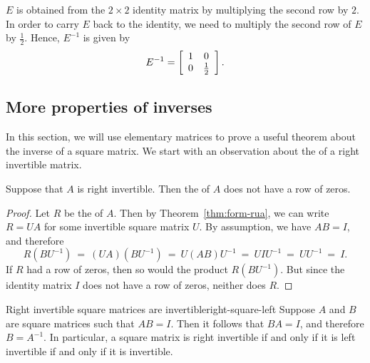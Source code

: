 \documentclass{ximera}
\begin{document}
\begin{solution}
  $E$ is obtained from the $2\times 2$ identity matrix by multiplying
  the second row by $2$. In order to carry $E$ back to the identity,
  we need to multiply the second row of $E$ by $\frac{1}{2}$.  Hence,
  $E^{-1}$ is given by
  \begin{equation*}
    E^{-1}
    =
    \startmat{cc}
      1 & 0 \\
      0 & \frac{1}{2}
    \stopmat.
  \end{equation*}
\end{solution}

\subsection{More properties of inverses}


In this section, we will use elementary matrices to prove a useful
theorem about the inverse of a square matrix. We start with an
observation about the {\ef} of a right invertible matrix.

\begin{lemma}
  Suppose that $A$ is right invertible. Then the {\rref} of $A$ does
  not have a row of zeros.
\end{lemma}

\begin{proof}
  Let $R$ be the {\rref} of $A$. Then by Theorem~\ref{thm:form-rua},
  we can write $R=UA$ for some invertible square matrix $U$. By
  assumption, we have $AB=I$, and therefore
  \begin{equation*}
    R(BU^{-1})
    ~=~
    (UA)(BU^{-1})
    ~=~
    U(AB)U^{-1}
    ~=~
    UIU^{-1}
    ~=~
    UU^{-1}
    ~=~
    I.
  \end{equation*}
  If $R$ had a row of zeros, then so would the product
  $R(BU^{-1})$. But since the identity matrix $I$ does not have a row
  of zeros, neither does $R$.
\end{proof}

\begin{theorem}{Right invertible square matrices are invertible}{right-square-left}
  Suppose $A$ and $B$ are square matrices such that $AB=I$. Then it
  follows that $BA=I$, and therefore $B=A^{-1}$. In particular, a
  square matrix is right invertible if and only if it is left
  invertible if and only if it is invertible.
\end{theorem}
\end{document}
